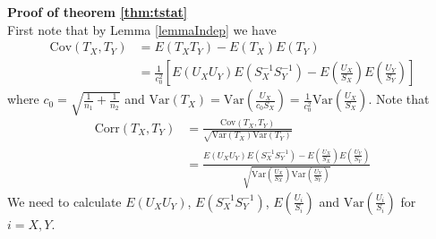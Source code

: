 \documentclass[12pt, a4paper]{article}
\newcommand{\cov}{\text{Cov}}
\newcommand{\cor}{\text{Corr}}
\newcommand{\var}{\text{Var}}
\begin{document}
	\textbf{Proof of theorem \ref{thm:tstat}} \\
	First note that by Lemma  \ref{lemmaIndep} we have
	\begin{align*}
		\cov(T_X, T_Y) &= E(T_XT_Y) - E(T_X)E(T_Y) \\
		& = \frac{1}{c_0^2} \left[E(U_XU_Y)E(S_X^{-1}S_Y^{-1}) - E(\frac{U_X}{S_X})E( \frac{U_Y}{S_Y})\right]   
	\end{align*}
	where $c_0 = \sqrt{\frac{1}{n_1} + \frac{1}{n_2}}$ and $\var(T_X) = \var(\frac{U_X}{c_0S_X})=
	\frac{1}{c_0^2}\var(\frac{U_X}{S_X})$. 
	Note that 
	\begin{equation}\label{eq:Tcorrelation}
		\begin{aligned}
			\cor(T_X, T_Y) & = \frac{\cov(T_X, T_Y) }{\sqrt{\var(T_X) \var(T_Y) }} \\
			& = \frac{E(U_XU_Y)E(S_X^{-1}S_Y^{-1}) - E(\frac{U_X}{S_X})E(
				\frac{U_Y}{S_Y})}{\sqrt{\var(\frac{U_X}{S_X})\var(\frac{U_Y}{S_Y})}} 
		\end{aligned}
	\end{equation}
	We need to calculate $E(U_XU_Y)$, $E(S_X^{-1}S_Y^{-1})$, $ E(\frac{U_i}{S_i})$ and
	$\var(\frac{U_i}{S_i})$ for $i =X, Y$. 
\end{document}
